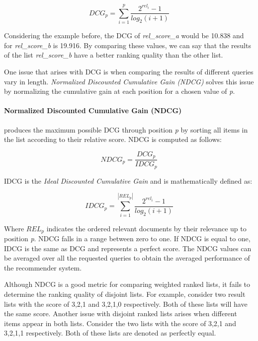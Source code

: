 \begin{equation}
    DCG_p = \sum_{i=1}^{p}\frac{2^{rel_i}-1}{log_2(i+1)}
    \label{eq:dcg}
\end{equation}

Considering the example before, the DCG of \emph{rel\_score\_a} would be 10.838 and for \emph{rel\_score\_b} is 19.916. By comparing these values, we can say that the results of the list \emph{rel\_score\_b} have a better ranking quality than the other list.

One issue that arises with DCG is when comparing the results of different queries vary in length. \emph{Normalized Discounted Cumulative Gain (NDCG)} solves this issue by normalizing the cumulative gain at each position for a chosen value of \emph{p}.

\paragraph*{Normalized Discounted Cumulative Gain (NDCG)} 
produces the maximum possible DCG through position \emph{p} by sorting all items in the list according to their relative score. NDCG is computed as follows:

\begin{equation}
    NDCG_p = \frac{DCG_p}{IDCG_p}
    \label{eq:ndcg}
\end{equation}

IDCG is the \emph{Ideal Discounted Cumulative Gain} and is mathematically defined as:

\begin{equation}
    IDCG_p = \sum_{i=1}^{|REL_p|}\frac{2^{rel_i}-1}{log_2(i+1)}
    \label{eq:idcg}
\end{equation}

Where \emph{$REL_p$} indicates the ordered relevant documents by their relevance up to position \emph{p}. NDCG falls in a range between zero to one. If NDCG is equal to one, IDCG is the same as DCG and represents a perfect score. The NDCG values can be averaged over all the requested queries to obtain the averaged performance of the recommender system.


Although NDCG is a good metric for comparing weighted ranked lists, it fails to determine the ranking quality of disjoint lists. For example, consider two result lists with the score of 3,2,1 and 3,2,1,0 respectively. Both of these lists will have the same score. Another issue with disjoint ranked lists arises when different items appear in both lists. Consider the two lists with the score of 3,2,1 and 3,2,1,1 respectively. Both of these lists are denoted as perfectly equal.


